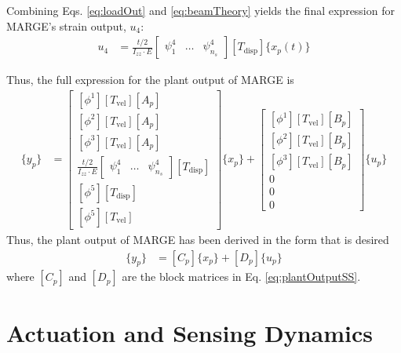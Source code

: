 Combining Eqs. \ref{eq:loadOut} and \ref{eq:beamTheory} yields the final expression for MARGE's strain output, $u_4$:
\begin{align}
	u_4 &= \frac{t/2}{I_{zz} \cdot E} \begin{bmatrix} \psi_1^4 & \dots & \psi_{n_s}^4 \end{bmatrix} [T_\text{disp}] \{x_p(t)\}
\end{align}

Thus, the full expression for the plant output of MARGE is
\begin{align}
	\label{eq:plantOutputSS}
	\{y_p\} &= \begin{bmatrix}
		\left[ \phi^1 \right] [T_\text{vel}] [A_p] \\
		\left[ \phi^2 \right] [T_\text{vel}] [A_p] \\
		\left[ \phi^3 \right] [T_\text{vel}] [A_p] \\
		\frac{t/2}{I_{zz} \cdot E} \begin{bmatrix} \psi_1^4 & \dots & \psi_{n_s}^4 \end{bmatrix} [T_\text{disp}] \\
		\left[ \phi^5 \right] [T_\text{disp}] \\
		\left[ \phi^5 \right] [T_\text{vel}]
	\end{bmatrix} \{x_p\} + \begin{bmatrix}
		\left[ \phi^1 \right] [T_\text{vel}] [B_p] \\
		\left[ \phi^2 \right] [T_\text{vel}] [B_p] \\
		\left[ \phi^3 \right] [T_\text{vel}] [B_p] \\
		0 \\ 0 \\ 0
	\end{bmatrix}  \{u_p\}
\end{align}
Thus, the plant output of MARGE has been derived in the form that is desired
\begin{align}
	\{y_p\} &= [C_p] \{x_p\} + [D_p] \{u_p\}
\end{align}
where $[C_p]$ and $[D_p]$ are the block matrices in Eq. \ref{eq:plantOutputSS}.

\section{Actuation and Sensing Dynamics} %

